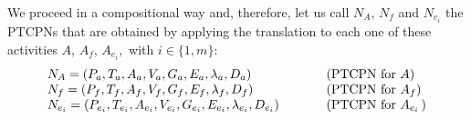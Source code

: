
We proceed in a compositional way and, therefore, let us call $N_A$, $N_{f}$ and $N_{e_i}$ the PTCPNs that
are obtained by applying the translation to each one of these
activities $A$, $A_f$, $A_{e_{i}},$ with $i\in\{1,m\}$:
%
\[
\begin{array}{lll}
N_A = (P_a, T_a, A_a, V_a, G_a, E_a, \lambda_a, D_a) &
\hspace*{0.6cm} & {\rm
(PTCPN~for~}A)\\
N_f = (P_f, T_f, A_f, V_f, G_f, E_f, \lambda_f, D_f)  &
\ & {\rm (PTCPN~for~}A_f)\\
N_{e_i} = (P_{e_i}, T_{e_i}, A_{e_i}, V_{e_i}, G_{e_i}, 
E_{e_i}, \lambda_{e_i}, D_{e_i})  &
\ & {\rm (PTCPN~for~}A_{e_i}\,)
\end{array}
\]

